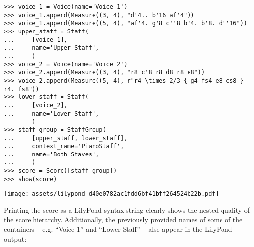 \begin{abjadbookoutput}
\begin{singlespacing}
\vspace{-0.5\baselineskip}
\begin{lstlisting}
>>> voice_1 = Voice(name='Voice 1')
>>> voice_1.append(Measure((3, 4), "d'4.. b'16 af'4"))
>>> voice_1.append(Measure((5, 4), "af'4. g'8 c''8 b'4. b'8. d''16"))
>>> upper_staff = Staff(
...     [voice_1],
...     name='Upper Staff',
...     )
>>> voice_2 = Voice(name='Voice 2')
>>> voice_2.append(Measure((3, 4), "r8 c'8 r8 d8 r8 e8"))
>>> voice_2.append(Measure((5, 4), r"r4 \times 2/3 { g4 fs4 e8 cs8 } r4. fs8"))
>>> lower_staff = Staff(
...     [voice_2],
...     name='Lower Staff',
...     )
>>> staff_group = StaffGroup(
...     [upper_staff, lower_staff],
...     context_name='PianoStaff',
...     name='Both Staves',
...     )
>>> score = Score([staff_group])
>>> show(score)
\end{lstlisting}
\noindent\texttt{[image: assets/lilypond-d40e0782ac1fdd6bf41bff264524b22b.pdf]}
\end{singlespacing}
\end{abjadbookoutput}

\noindent Printing the score as a LilyPond syntax string clearly shows the
nested quality of the score hierarchy. Additionally, the previously provided
names of some of the containers -- e.g. \enquote{Voice 1} and \enquote{Lower
Staff} -- also appear in the LilyPond output:

\begin{comment}
<abjad>
print(format(score))
</abjad>
\end{comment}

